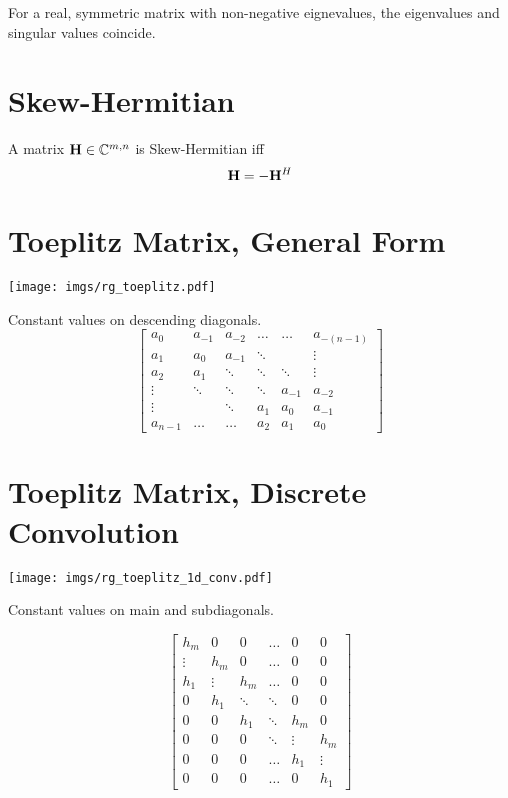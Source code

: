 For a real, symmetric matrix with non-negative eignevalues, the eigenvalues and singular values coincide.



\section{Skew-Hermitian}
A matrix $\mathbf{H}\in\mathbb{C}^{m,n}$ is Skew-Hermitian iff
\begin{equation}
\mathbf{H}=-\mathbf{H}^H
\end{equation}



\section{Toeplitz Matrix, General Form}

\begin{center}
\texttt{[image: imgs/rg\_toeplitz.pdf]}
\end{center}
Constant values on descending diagonals.
\begin{equation}
\begin{bmatrix}
  a_{0} & a_{-1} & a_{-2} & \ldots  & \ldots & a_{-(n-1)}  \\
  a_{1} & a_0    & a_{-1} & \ddots  &        & \vdots \\
  a_{2} & a_{1}  & \ddots & \ddots  & \ddots & \vdots \\ 
 \vdots & \ddots & \ddots & \ddots  & a_{-1} & a_{-2}\\
 \vdots &        & \ddots & a_{1}   & a_{0}  & a_{-1} \\
a_{n-1} & \ldots & \ldots & a_{2}   & a_{1}  & a_{0}
\end{bmatrix}
\end{equation}


\section{Toeplitz Matrix, Discrete Convolution}

\begin{center}
\texttt{[image: imgs/rg\_toeplitz\_1d\_conv.pdf]}
\end{center}

Constant values on main and subdiagonals.

\begin{equation}
\begin{bmatrix}
  h_m &   0 &   0 &      \hdots &   0 &   0 \\
  \vdots & h_m &   0 &   \hdots &   0 &   0 \\
  h_1 & \vdots & h_m &   \hdots &   0 &   0 \\
    0 & h_1 & \ddots & \ddots &   0 &   0 \\
    0 &   0 & h_1 &    \ddots & h_m &   0 \\
    0 &   0 &   0 &    \ddots & \vdots & h_m \\
    0 &   0 &   0 &      \hdots & h_1 & \vdots \\
    0 &   0 &   0 &      \hdots &   0 & h_1 
\end{bmatrix}
\end{equation}


